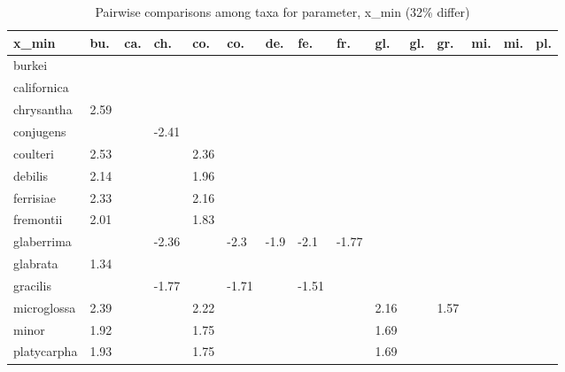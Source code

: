 \begin{table}[ht]
\centering
\caption{Pairwise comparisons among taxa for parameter, x\_min (32\% differ)} 
\begin{tabular}{lllllllllllllll}
  \hline
x\_min & bu. & ca. & ch. & co. & co. & de. & fe. & fr. & gl. & gl. & gr. & mi. & mi. & pl. \\ 
  \hline
burkei &  &  &  &  &  &  &  &  &  &  &  &  &  &  \\ 
  californica &  &  &  &  &  &  &  &  &  &  &  &  &  &  \\ 
  chrysantha & 2.59 &  &  &  &  &  &  &  &  &  &  &  &  &  \\ 
  conjugens &  &  & -2.41 &  &  &  &  &  &  &  &  &  &  &  \\ 
  coulteri & 2.53 &  &  & 2.36 &  &  &  &  &  &  &  &  &  &  \\ 
  debilis & 2.14 &  &  & 1.96 &  &  &  &  &  &  &  &  &  &  \\ 
  ferrisiae & 2.33 &  &  & 2.16 &  &  &  &  &  &  &  &  &  &  \\ 
  fremontii & 2.01 &  &  & 1.83 &  &  &  &  &  &  &  &  &  &  \\ 
  glaberrima &  &  & -2.36 &  & -2.3 & -1.9 & -2.1 & -1.77 &  &  &  &  &  &  \\ 
  glabrata & 1.34 &  &  &  &  &  &  &  &  &  &  &  &  &  \\ 
  gracilis &  &  & -1.77 &  & -1.71 &  & -1.51 &  &  &  &  &  &  &  \\ 
  microglossa & 2.39 &  &  & 2.22 &  &  &  &  & 2.16 &  & 1.57 &  &  &  \\ 
  minor & 1.92 &  &  & 1.75 &  &  &  &  & 1.69 &  &  &  &  &  \\ 
  platycarpha & 1.93 &  &  & 1.75 &  &  &  &  & 1.69 &  &  &  &  &  \\ 
   \hline
\end{tabular}
\end{table}
